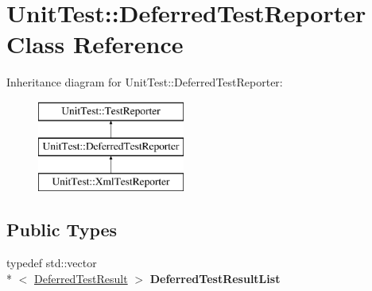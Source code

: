 \hypertarget{classUnitTest_1_1DeferredTestReporter}{\section{Unit\-Test\-:\-:Deferred\-Test\-Reporter Class Reference}
\label{classUnitTest_1_1DeferredTestReporter}
}
Inheritance diagram for Unit\-Test\-:\-:Deferred\-Test\-Reporter\-:\begin{figure}[H]
\begin{center}
\leavevmode
\includegraphics[height=3.000000cm]{classUnitTest_1_1DeferredTestReporter}
\end{center}
\end{figure}
\subsection*{Public Types}
\begin{DoxyCompactItemize}
\item 
\hypertarget{classUnitTest_1_1DeferredTestReporter_ab84400b5a477230d8f04639b913abe4d}{typedef std\-::vector\\*
$<$ \hyperlink{structUnitTest_1_1DeferredTestResult}{Deferred\-Test\-Result} $>$ {\bfseries Deferred\-Test\-Result\-List}}\label{classUnitTest_1_1DeferredTestReporter_ab84400b5a477230d8f04639b913abe4d}

\end{DoxyCompactItemize}
